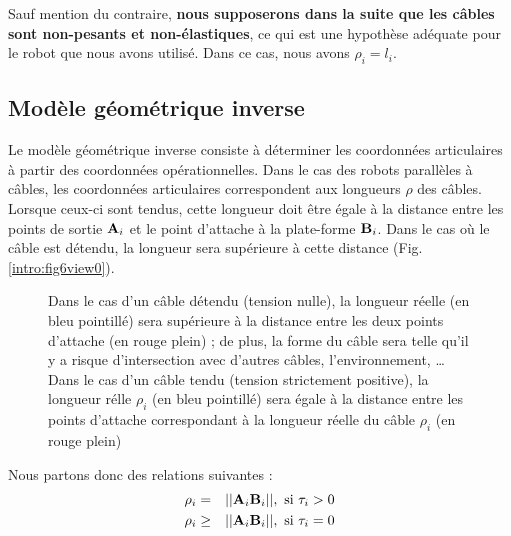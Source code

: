Sauf mention du contraire, {\bf nous supposerons dans la suite que les câbles 
sont non-pesants et non-élastiques}, ce qui est une hypothèse adéquate pour le 
robot que nous avons utilisé. Dans ce cas, nous avons $\rho_i = l_i$.

\subsection{Modèle géométrique inverse} \label{chap0-1-1}

Le modèle géométrique inverse consiste à déterminer les coordonnées 
articulaires à partir des coordonnées opérationnelles. Dans le cas des robots 
parallèles à câbles, les coordonnées articulaires correspondent aux longueurs 
$\rho$ des câbles. Lorsque ceux-ci sont tendus, cette longueur doit être égale à 
la distance entre les points de sortie ${\bf A}_i$ et le point d'attache à la 
plate-forme ${\bf B}_i$. Dans le cas où le câble est détendu, la longueur sera 
supérieure à cette distance (Fig.\ref{intro:fig6view0}).\\

\begin{figure}[!ht]
  \centering
\hfill
{}
    \caption{\footnotesize{Dans le cas d'un câble détendu (tension nulle), la 
longueur r\'eelle (en bleu pointill\'e) sera supérieure à la distance entre les 
deux points d'attache (en rouge plein) ; de plus, la forme du câble sera telle 
qu'il y a risque d'intersection avec d'autres câbles, l'environnement, \dots 
Dans le cas d'un câble tendu (tension strictement positive), la 
longueur r\'elle $\rho_i$ (en bleu pointill\'e) sera \'egale à la 
distance entre les points d'attache correspondant à la longueur réelle du 
câble $\rho_i$ (en rouge plein)}}
\label{intro:fig6}
\end{figure}

Nous partons donc des relations suivantes :
\begin{eqnarray}
\rho_i &=& ||{\bf A}_i {\bf B}_i||, \hbox{ si } \tau_i > 0 \\ 
\rho_i &\geq& ||{\bf A}_i {\bf B}_i||, \hbox{ si } \tau_i = 0
\label{intro:eq1}
\end{eqnarray}

